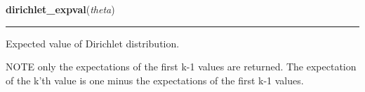     \label{pymc:distributions:dirichlet_expval}

    \vspace{0.5ex}

    \begin{boxedminipage}{\textwidth}

    \raggedright \textbf{dirichlet\_expval}(\textit{theta})

    \vspace{-1.5ex}

    \rule{\textwidth}{0.5\fboxrule}

Expected value of Dirichlet distribution.

NOTE only the expectations of the first k-1 values are returned.
The expectation of the k'th value is one minus the expectations of
the first k-1 values.
    \vspace{1ex}

    \end{boxedminipage}

    \label{pymc:distributions:dirichlet_like}

    \vspace{0.5ex}

